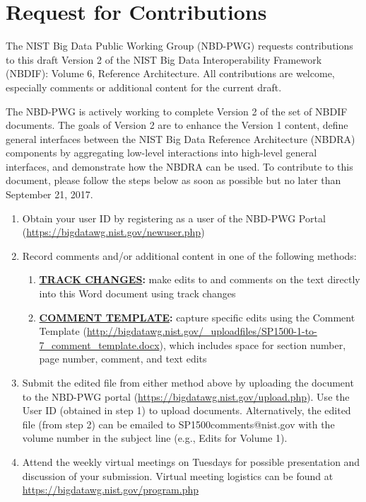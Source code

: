 \section*{\hfill Request for Contributions \hfill}

The NIST Big Data Public Working Group (NBD-PWG) requests
contributions to this draft Version 2 of the NIST Big Data
Interoperability Framework (NBDIF): Volume 6, Reference Architecture.
All contributions are welcome, especially comments or additional
content for the current draft. 

The NBD-PWG is actively working to complete Version 2 of the set of NBDIF documents. The goals of Version 2 are to enhance the Version 1 content, define general interfaces between the NIST Big Data Reference Architecture (NBDRA) components by aggregating low-level interactions into high-level general interfaces, and demonstrate how the NBDRA can be used. 
To contribute to this document, please follow the steps below as soon as possible but no later than September 21, 2017.

\begin{enumerate}

\item	Obtain your user ID by registering as a user of the NBD-PWG
  Portal (\url{https://bigdatawg.nist.gov/newuser.php})

\item	Record comments and/or additional content in one of the
  following methods:

  \begin{enumerate}

  \item {\bf\underline{TRACK CHANGES}:} make edits to and comments on the text
    directly into this Word document using track changes

    \item {\bf\underline{COMMENT TEMPLATE}:} capture specific edits using the Comment
      Template
      (\url{http://bigdatawg.nist.gov/_uploadfiles/SP1500-1-to-7_comment_template.docx}),
      which includes space for section number, page number, comment,
      and text edits

\end{enumerate}

\item Submit the edited file from either method above by uploading the
  document to the NBD-PWG portal
  (\url{https://bigdatawg.nist.gov/upload.php}). Use the User ID
  (obtained in step 1) to upload documents. Alternatively, the edited
  file (from step 2) can be emailed to SP1500comments@nist.gov with
  the volume number in the subject line (e.g., Edits for Volume 1).

\item	Attend the weekly virtual meetings on Tuesdays for possible
  presentation and discussion of your submission. Virtual meeting
  logistics can be found at
  \url{https://bigdatawg.nist.gov/program.php}
\end{enumerate}

